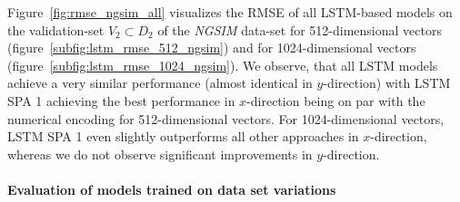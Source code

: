 Figure~\ref{fig:rmse_ngsim_all} visualizes the \ac{RMSE} of all \ac{LSTM}-based models on the validation-set $V_2 \subset D_2$ of the \emph{\ac{NGSIM}} data-set for \num{512}-dimensional vectors (figure~\ref{subfig:lstm_rmse_512_ngsim}) and for \num{1024}-dimensional vectors (figure~\ref{subfig:lstm_rmse_1024_ngsim}).
We observe, that all \ac{LSTM} models achieve a very similar performance (almost identical in $y$-direction) with \ac{LSTM} \ac{SPA} \num{1} achieving the best performance in $x$-direction being on par with the numerical encoding for \num{512}-dimensional vectors.
For \num{1024}-dimensional vectors, \ac{LSTM} \ac{SPA} \num{1} even slightly outperforms all other approaches in $x$-direction, whereas we do not observe significant improvements in $y$-direction.

\paragraph{Evaluation of models trained on data set variations}%
\label{par:evaluation_of_models_trained_on_data_set_variations}

